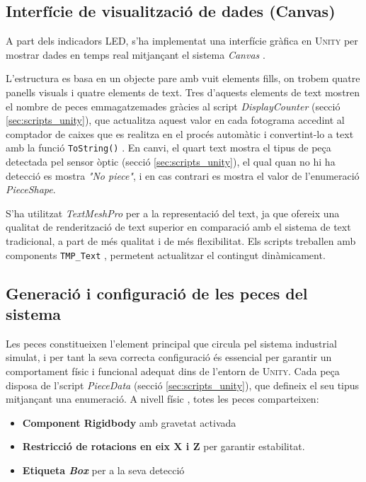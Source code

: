 \documentclass[a4paper,11pt,DIV=13,headings=normal,abstract=true,twoside=semi]{article}
\newcommand{\acro}[1]{\textsc{#1}}
\begin{document}
\subsection{Interfície de visualització de dades (Canvas)}

A part dels indicadors LED, s'ha implementat una interfície gràfica en \acro{Unity} per mostrar dades en temps real mitjançant el sistema \emph{Canvas} \cite{UnityCanvas}.

L'estructura es basa en un objecte pare amb vuit elements fills, on trobem quatre panells visuals i quatre elements de text. Tres d'aquests elements de text mostren el nombre de peces emmagatzemades gràcies al script \emph{DisplayCounter} (secció \ref{sec:scripts_unity}), que actualitza aquest valor en cada fotograma accedint al comptador de caixes que es realitza en el procés automàtic i convertint-lo a text amb la funció \texttt{ToString()} \cite{dotnet_collections}. En canvi, el quart text mostra el tipus de peça detectada pel sensor òptic (secció \ref{sec:scripts_unity}), el qual quan no hi ha detecció es mostra \emph{"No piece"}, i en cas contrari es mostra el valor de l'enumeració \emph{PieceShape}.

S'ha utilitzat \emph{TextMeshPro} per a la representació del text, ja que ofereix una qualitat de renderització de text superior en comparació amb el sistema de text tradicional, a part de més qualitat i de més flexibilitat. Els scripts treballen amb components \texttt{TMP\_Text} \cite{dotnet_text}, permetent actualitzar el contingut dinàmicament. 

\subsection{Generació i configuració de les peces del sistema}

Les peces constitueixen l'element principal que circula pel sistema industrial simulat, i per tant la seva correcta configuració és essencial per garantir un comportament físic i funcional adequat dins de l'entorn de \acro{Unity}. Cada peça disposa de l'script \emph{PieceData} (secció \ref{sec:scripts_unity}), que defineix el seu tipus mitjançant una enumeració. A nivell físic \cite{UnityRigidbody}, totes les peces comparteixen:

\begin{itemize}

\item \textbf{Component Rigidbody} amb gravetat activada

\item \textbf{Restricció de rotacions en eix X i Z} per garantir estabilitat. 

\item \textbf{Etiqueta \emph{Box}} per a la seva detecció \cite{UnityTags2023}


\end{itemize}
\end{document}
